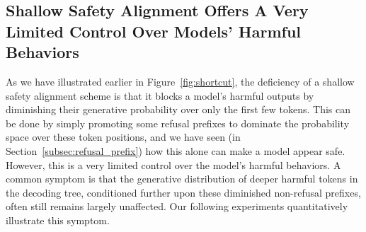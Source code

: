 




\subsection{Shallow Safety Alignment Offers A Very Limited Control Over Models' Harmful Behaviors}
\label{subsec:conferfactual}






As we have illustrated earlier in Figure~\ref{fig:shortcut}, the deficiency of a shallow safety alignment scheme is that it blocks a model's harmful outputs by diminishing their generative probability over only the first few tokens. This can be done by simply promoting some refusal prefixes to dominate the probability space over these token positions, and we have seen (in Section~\ref{subsec:refusal_prefix}) how this alone can make a model appear safe. However, this is a very limited control over the model's harmful behaviors. A common symptom is that the generative distribution of deeper harmful tokens in the decoding tree, conditioned further upon these diminished non-refusal prefixes, often still remains largely unaffected. Our following experiments quantitatively illustrate this symptom.

